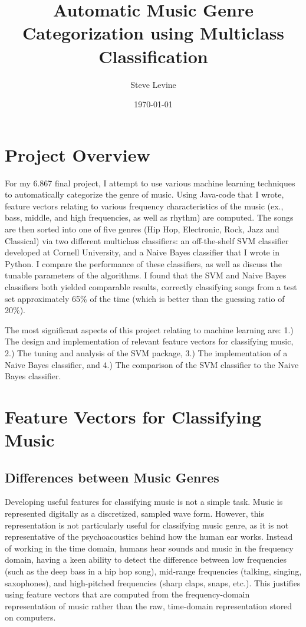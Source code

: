 \documentclass[aps,twocolumn,secnumarabic,balancelastpage,amsmath,amssymb,nofootinbib]{revtex4-1}
\begin{document}
\title{Automatic Music Genre Categorization using Multiclass Classification}
\author         {Steve Levine}
\date{\today}

\maketitle

\section{Project Overview}
For my 6.867 final project, I attempt to use various machine learning techniques to automatically categorize the genre of music. Using Java-code that I wrote, feature vectors relating to various frequency characteristics of the music (ex., bass, middle, and high frequencies, as well as rhythm) are computed. The songs are then sorted into one of five genres (Hip Hop, Electronic, Rock, Jazz and Classical) via two different multiclass classifiers: an off-the-shelf SVM classifier developed at Cornell University, and a Naive Bayes classifier that I wrote in Python. I compare the performance of these classifiers, as well as discuss the tunable parameters of the algorithms. I found that the SVM and Naive Bayes classifiers both yielded comparable results, correctly classifying songs from a test set approximately 65\% of the time (which is better than the guessing ratio of 20\%).

The most significant aspects of this project relating to machine learning are: 1.) The design and implementation of relevant feature vectors for classifying music, 2.) The tuning and analysis of the SVM package, 3.) The implementation of a Naive Bayes classifier, and 4.) The comparison of the SVM classifier to the Naive Bayes classifier.

\section{Feature Vectors for Classifying Music}
\subsection*{Differences between Music Genres}
Developing useful features for classifying music is not a simple task. Music is represented digitally as a discretized, sampled wave form. However, this representation is not particularly useful for classifying music genre, as it is not representative of the psychoacoustics behind how the human ear works. Instead of working in the time domain, humans hear sounds and music in the frequency domain, having a keen ability to detect the difference between low frequencies (such as the deep bass in a hip hop song), mid-range frequencies (talking, singing, saxophones), and high-pitched frequencies (sharp claps, snaps, etc.). This justifies using feature vectors that are computed from the frequency-domain representation of music rather than the raw, time-domain representation stored on computers.
\end{document}
